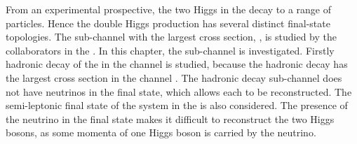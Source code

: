 


From an experimental prospective, the two Higgs in the  \eeToHH decay to a range of particles. Hence the double Higgs production has several distinct final-state topologies. The sub-channel with the largest cross section, \eeToHHbbbb, is studied by the collaborators in the \CERN. In this chapter, the \eeToHHbbWW sub-channel  is investigated. Firstly hadronic decay of the \WW in the \eeToHHbbWW channel is studied, because the hadronic decay has the largest cross section  in the \eeToHHbbWW channel . The hadronic decay sub-channel  does not have   neutrinos in the final state, which allows each \PW to be reconstructed. The semi-leptonic final state of the \WW system in the \eeToHHbbWW is also considered. The presence of the neutrino in the final state makes it  difficult to reconstruct the two Higgs bosons, as some momenta of one Higgs boson is carried by the neutrino. %




